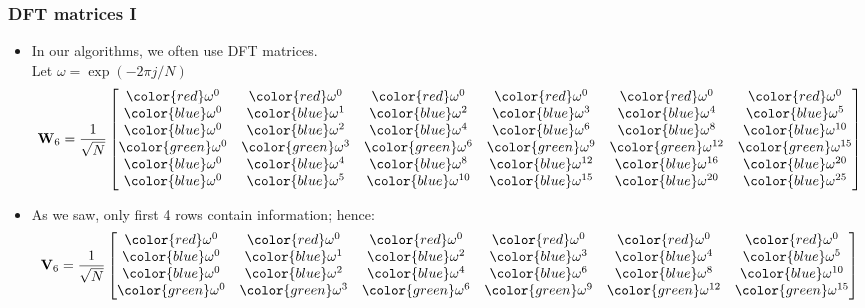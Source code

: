 \documentclass{beamer}
\begin{document}
\begin{frame}
\frametitle{DFT matrices I}
\begin{itemize}
    \item In our algorithms, we often use DFT matrices. \\Let $\omega = \exp\left(-2\pi j / N\right)$
    \begin{equation}
        \mathbf{W}_6 = \frac{1}{\sqrt{N}}\begin{bmatrix}
            {\color{red}\omega^0} & {\color{red}\omega^0} & {\color{red}\omega^0} & {\color{red}\omega^0} & {\color{red}\omega^0} & {\color{red}\omega^0}\\
            {\color{blue}\omega^0} & {\color{blue}\omega^1} & {\color{blue}\omega^2} & {\color{blue}\omega^3} & {\color{blue}\omega^4} & {\color{blue}\omega^5}\\
            {\color{blue}\omega^0} & {\color{blue}\omega^2} & {\color{blue}\omega^4} & {\color{blue}\omega^6} & {\color{blue}\omega^8} & {\color{blue}\omega^{10}}\\
            {\color{green}\omega^0} & {\color{green}\omega^3} & {\color{green}\omega^6} & {\color{green}\omega^9} &  {\color{green} \omega^{12}} & {\color{green} \omega^{15}}\\
            {\color{blue}\omega^0} & {\color{blue}\omega^4} & {\color{blue}\omega^8} & {\color{blue}\omega^{12}} & {\color{blue}\omega^{16}} & {\color{blue}\omega^{20}}\\
            {\color{blue}\omega^0} & {\color{blue}\omega^5} & {\color{blue}\omega^{10}}& {\color{blue} \omega^{15}} & {\color{blue}\omega^{20}} & {\color{blue}\omega^{25}}
        \end{bmatrix}
    \end{equation}
    \item As we saw, only first 4 rows contain information; hence:
    \begin{equation}
        \mathbf{V}_6 = \frac{1}{\sqrt{N}}\begin{bmatrix}
            {\color{red}\omega^0} & {\color{red}\omega^0} & {\color{red}\omega^0} & {\color{red}\omega^0} & {\color{red}\omega^0} & {\color{red}\omega^0}\\
            {\color{blue}\omega^0} & {\color{blue}\omega^1} & {\color{blue}\omega^2} & {\color{blue}\omega^3} & {\color{blue}\omega^4} & {\color{blue}\omega^5}\\
            {\color{blue}\omega^0} & {\color{blue}\omega^2} & {\color{blue}\omega^4} & {\color{blue}\omega^6} & {\color{blue}\omega^8} & {\color{blue}\omega^{10}}\\
            {\color{green}\omega^0} & {\color{green}\omega^3} & {\color{green}\omega^6} & {\color{green}\omega^9} &  {\color{green} \omega^{12}} & {\color{green} \omega^{15}}\\
        \end{bmatrix}
    \end{equation}
\end{itemize}
\end{frame}
\end{document}
